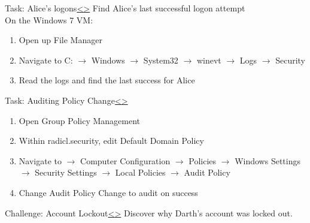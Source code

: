 \documentclass[12pt]{extarticle}
\newenvironment{instructionblock}{\Large\bgroup}{\egroup}
\newcommand{\ben}{\begin{enumerate}}
\newcommand{\een}{\end{enumerate}}
\begin{document}

\pagebreak
\begin{slide}{Task: Alice's logons}{\hyperref[slide 5]{\textless}\hyperref[slide 7]{\textgreater}}
	\vskip 5pt
	\begin{instructionblock}
		Find Alice's last successful logon attempt \\
		On the Windows 7 VM:
		\ben 
			\item Open up File Manager
			\item Navigate to C: $\rightarrow$ Windows $\rightarrow$ System32 $\rightarrow$ winevt $\rightarrow$ Logs $\rightarrow$ Security
			\item Read the logs and find the last success for Alice
		\een
	\end{instructionblock}
\end{slide}



\pagebreak
\begin{slide}{Task: Auditing Policy Change}{\hyperref[slide 6]{\textless}\hyperref[slide 8]{\textgreater}}
\vskip 5pt
\begin{instructionblock}
	\ben
		\item Open Group Policy Management
		\item Within radicl.security, edit Default Domain Policy
		\item Navigate to $\rightarrow$ Computer Configuration $\rightarrow$ Policies $\rightarrow$ Windows Settings $\rightarrow$ Security Settings $\rightarrow$ Local Policies $\rightarrow$ Audit Policy
		\item Change Audit Policy Change to audit on success
	\een 
\end{instructionblock}
\end{slide}

\pagebreak
\begin{slide}{Challenge: Account Lockout}{\hyperref[slide 7]{\textless}\hyperref[slide 9]{\textgreater}}
	\vskip 5pt
	\begin{instructionblock}
	Discover why Darth's account was locked out.
	\end{instructionblock}
\end{slide}
\end{document}
